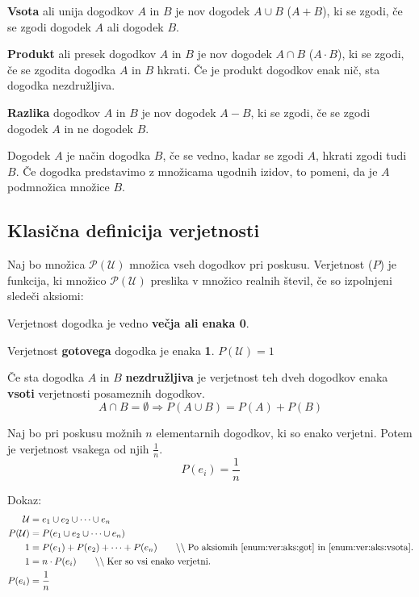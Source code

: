 \documentclass[a4paper,oneside,12pt,fleqn]{article}
\newcommand\krat\cdot
\newcommand{\comment}[1]{\ensuremath{\qquad\backslash\backslash\;}\textnormal{#1}}
\renewcommand\implies\Rightarrow
\numberwithin{equation}{section}
\newenvironment{enumerate*}%
{
\vspace{-12pt}%
\begin{enumerate}%
\setlength{\itemsep}{0pt}%
\setlength{\parskip}{2pt}}%
{\end{enumerate}}
\begin{document}
\textbf{Vsota} ali unija dogodkov $A$ in $B$ je nov dogodek $A \cup B$ ($A+B$), ki se zgodi, če se
zgodi dogodek $A$ ali dogodek $B$.

\textbf{Produkt} ali presek dogodkov $A$ in $B$ je nov dogodek $A \cap B$ ($A\krat B$), ki se
zgodi, če se zgodita dogodka $A$ in $B$ hkrati. Če je produkt dogodkov enak nič, sta
dogodka nezdružljiva.

\textbf{Razlika} dogodkov $A$ in $B$ je nov dogodek $A - B$, ki se zgodi, če se zgodi dogodek $A$
in ne dogodek $B$.

Dogodek $A$ je način dogodka $B$, če se vedno, kadar se zgodi $A$, hkrati zgodi tudi $B$.
Če dogodka predstavimo z množicama ugodnih izidov, to pomeni, da je $A$ podmnožica množice
$B$.

\subsection{Klasična definicija verjetnosti}
\label{sec:verj:def}

Naj bo množica $\mathcal P(\mathcal U)$ množica vseh dogodkov pri poskusu. Verjetnost ($P$) je
funkcija, ki množico $\mathcal P (\mathcal U)$ preslika v množico realnih števil, če so
izpolnjeni sledeči aksiomi:
\begin{enumerate*}
  \item Verjetnost dogodka je vedno \textbf{večja ali enaka 0}.
  \item Verjetnost \textbf{gotovega} dogodka je enaka \textbf{1}. $P(\mathcal U) = 1$
    \label{enum:ver:aks:got}
  \item Če sta dogodka $A$ in $B$ \textbf{nezdružljiva} je verjetnost teh dveh dogodkov
    enaka \textbf{vsoti} verjetnosti posameznih dogodkov.
    \[ A \cap B = \emptyset \implies P(A \cup B) = P(A) + P(B) \] \label{enum:ver:aks:vsota}
\end{enumerate*}

\vspace{-5ex}
Naj bo pri poskusu možnih $n$ elementarnih dogodkov, ki so enako verjetni. Potem je
verjetnost vsakega od njih $\frac{1}{n}$. 
\[ P(e_i) = \frac{1}{n} \]

Dokaz:
\begin{align*}
  \mathcal U &=  e_1 \cup e_2 \cup \cdots \cup e_n \\
  P(\mathcal U) &= P(e_1 \cup e_2 \cup \cdots \cup e_n) \\
  1 &= P(e_1) + P(e_2) + \cdots + P(e_n) \comment{Po aksiomih \ref{enum:ver:aks:got} in
  \ref{enum:ver:aks:vsota}.} \\
  1 &= n\krat P(e_i) \comment{Ker so vsi enako verjetni.} \\
  P(e_i) &= \frac{1}{n}
\end{align*}
\end{document}
